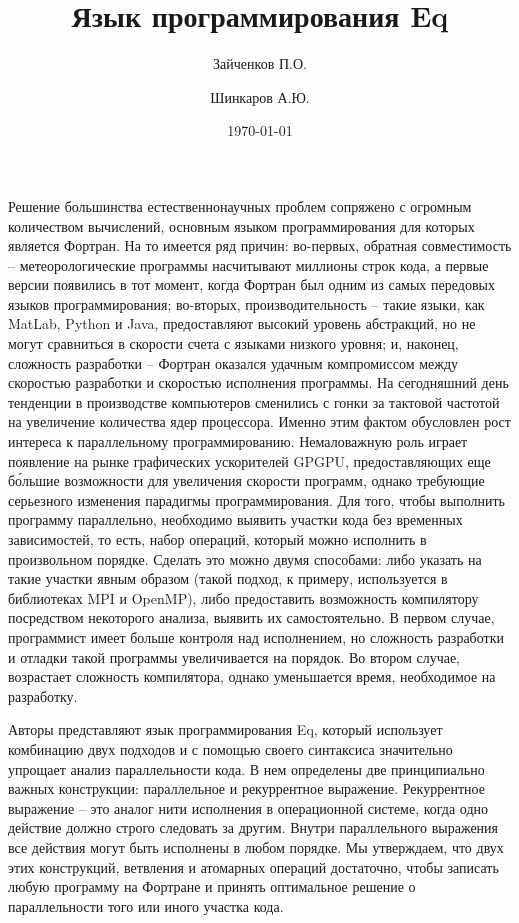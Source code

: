 \documentclass[a4paper]{llncs}
\author{Зайченков П.О.\inst{1} \and Шинкаров А.Ю.\inst{2}}
\date{\today}
\title{Язык программирования Eq}
\institute{
  Московский физико-технический институт,
  Кафедра информатики и вычислительной техники
\and
  University of Hertfordshire,
  Hatfield, Hertfordshire,
  AL10 9AB, United Kingdom
}
\begin{document}
\maketitle

Решение большинства естественнонаучных проблем сопряжено с огромным количеством
вычислений, основным языком программирования для которых является Фортран. На то
имеется ряд причин: во-первых, обратная совместимость -- метеорологические
программы насчитывают миллионы строк кода, а первые версии появились в тот
момент, когда Фортран был одним из самых передовых языков программирования;
во-вторых, производительность -- такие языки, как MatLab, Python и Java,
предоставляют высокий уровень абстракций, но не могут сравниться в скорости
счета с языками низкого уровня; и, наконец, сложность разработки -- Фортран
оказался удачным компромиссом между скоростью разработки и скоростью исполнения
программы. На сегодняшний день тенденции в производстве компьютеров сменились с
гонки за тактовой частотой на увеличение количества ядер процессора. Именно этим
фактом обусловлен рост интереса к параллельному программированию. Немаловажную
роль играет появление на рынке графических ускорителей GPGPU, предоставляющих
еще б\'{о}льшие возможности для увеличения скорости программ, однако требующие
серьезного изменения парадигмы программирования. Для того, чтобы выполнить
программу параллельно, необходимо выявить участки кода без временных
зависимостей, то есть, набор операций, который можно исполнить в произвольном
порядке. Сделать это можно двумя способами: либо указать на такие участки явным
образом (такой подход, к примеру, используется в библиотеках MPI и OpenMP), либо
предоставить возможность компилятору  посредством некоторого анализа, выявить их
самостоятельно. В первом случае, программист имеет больше контроля над
исполнением, но сложность разработки и отладки такой программы увеличивается на
порядок. Во втором случае, возрастает сложность компилятора, однако уменьшается
время, необходимое на разработку.

Авторы представляют язык программирования Eq, который использует комбинацию двух
подходов и с помощью своего синтаксиса значительно упрощает анализ
параллельности кода. В нем определены две принципиально важных конструкции:
параллельное и рекуррентное выражение. Рекуррентное выражение -- это аналог нити
исполнения в операционной системе, когда одно действие должно строго следовать
за другим. Внутри параллельного выражения все действия могут быть исполнены в
любом порядке. Мы утверждаем, что двух этих конструкций, ветвления и атомарных
операций достаточно, чтобы записать любую программу на Фортране и принять
оптимальное решение о параллельности того или иного участка кода.
\end{document}

